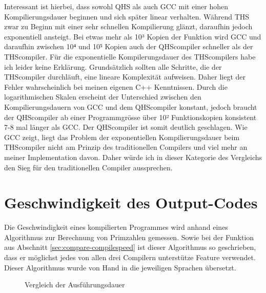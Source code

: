 Interessant ist hierbei, dass sowohl QHS als auch GCC mit einer hohen Kompilierungsdauer beginnen und sich später linear verhalten. Während THS zwar zu Beginn mit einer sehr schnellen Kompilierung glänzt,
daraufhin jedoch exponentiell ansteigt. Bei etwas mehr als 10³ Kopien der Funktion wird GCC und daraufhin zwischen 10⁴ und 10⁵ Kopien auch der QHScompiler schneller als der THScompiler. Für die exponentielle Kompilerungsdauer
des THScompilers habe ich leider keine Erklärung. Grundsätzlich sollten alle Schritte, die der THScompiler durchläuft, eine lineare Komplexität aufweisen. Daher liegt der Fehler wahrscheinlich bei meinen eigenen C++ Kenntnissen.
Durch die logarithmischen Skalen erscheint der Unterschied zwischen den Kompilierungsdauern von GCC und dem QHScompiler konstant, jedoch braucht der QHScompiler ab einer Programmgrösse über 10² Funktionskopien konsistent 7-8 mal
länger als GCC. 
Der QHScompiler ist somit deutlich geschlagen. Wie GCC zeigt, liegt das Problem der exponentiellen Kompilierungsdauer beim THScompiler nicht am Prinzip des traditionellen Compilers und viel mehr an meiner Implementation davon.
Daher würde ich in dieser Kategorie des Vergleichs den Sieg für den traditionellen Compiler aussprechen.


\section{Geschwindigkeit des Output-Codes}
Die Geschwindigkeit eines kompilierten Programmes wird anhand eines Algorithmus zur Berechnung von Primzahlen gemessen. Sowie bei der Funktion aus Abschnitt \ref{sec:compare-compilespeed} ist dieser Algorithmus so geschrieben,
dass er möglichst jedes von allen drei Compilern unterstütze Feature verwendet. Dieser Algorithmus wurde von Hand in die jeweiligen Sprachen übersetzt.

\begin{figure}[h!]
\centering
\label{fig:executespeed}
\caption{Vergleich der Ausführungsdauer}
\end{figure}

